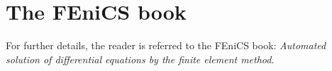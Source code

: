 \documentclass{fenicsbook}
\begin{document}
\frontmatter


%




\mainmatter







\chapter{The FEniCS book}

For further details, the reader is referred to the FEniCS book: \emph{Automated solution of differential equations by the finite element method}.

\label{chap:alnes-2}
\label{chap:alnes-3}
\label{chap:hentschel}
\label{chap:hoffman-1}
\label{chap:kirby-1}
\label{chap:kirby-2}
\label{chap:kirby-3}
\label{chap:kirby-6}
\label{chap:kvs-1}
\label{chap:kvs-2}
\label{chap:logg-1}
\label{chap:logg-3}
\label{chap:lopes}
\label{chap:mardal-2}
\label{chap:mortensen}
\label{chap:narayanan}
\label{chap:selim}
\label{chap:terrel}
\label{chap:wilbers}
\label{chap:vynnytska}

\backmatter \markboth{}{} %




\printindex

\end{document}

